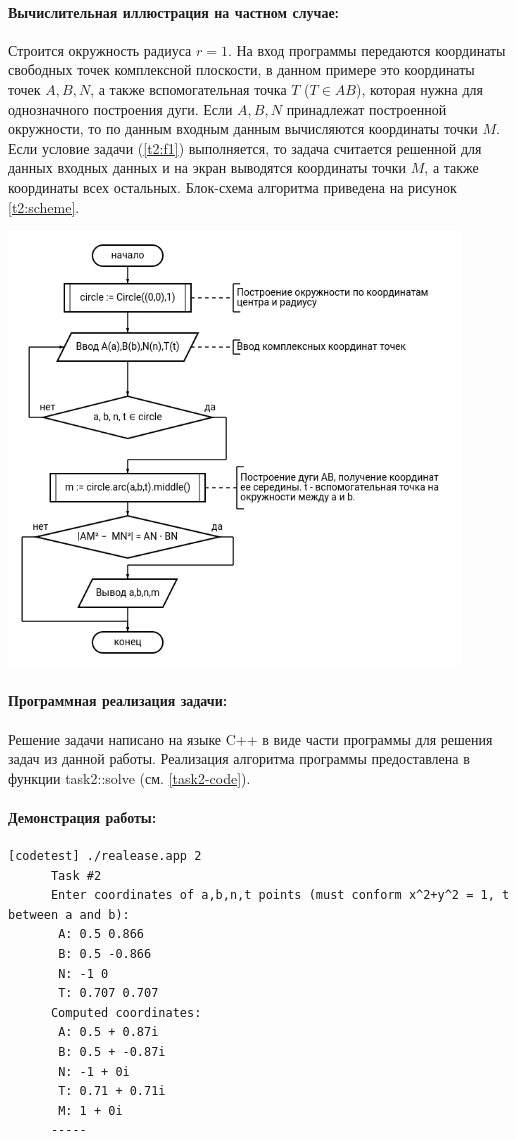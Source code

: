 {   \paragraph{Вычислительная иллюстрация на частном случае:}
   Строится окружность радиуса \(r = 1\). На вход программы передаются координаты свободных точек комплексной
   плоскости, в данном примере это координаты точек \(A,B,N\),
   а также вспомогательная точка \(T\) (\(T \in AB\)), которая нужна для однозначного построения дуги. Если \(A,B,N\)
   принадлежат построенной окружности, то по данным
   входным данным вычисляются координаты точки \(M\). Если условие задачи (\ref{t2:f1}) выполняется, то задача
   считается решенной для данных входных данных и на экран
   выводятся координаты точки \(M\), а также координаты всех остальных. Блок-схема алгоритма приведена на
   рисунок \ref{t2:scheme}.
   \begin{center}
      \includegraphics[width=0.9\textwidth]{images/task2-diagram.png}
      \label{t2:scheme}
   \end{center}
   \paragraph{Программная реализация задачи:}
   Решение задачи написано на языке C++ в виде части программы для решения задач из данной работы.
   Реализация алгоритма программы предоставлена в функции task2::solve (см. \ref{task2-code}).
   \paragraph{Демонстрация работы:}
   \vphantom{code}
   \begin{lstlisting}[language={},frame=none]
      [codetest] ./realease.app 2
      Task #2
      Enter coordinates of a,b,n,t points (must conform x^2+y^2 = 1, t between a and b):
       A: 0.5 0.866
       B: 0.5 -0.866
       N: -1 0
       T: 0.707 0.707
      Computed coordinates:
       A: 0.5 + 0.87i
       B: 0.5 + -0.87i
       N: -1 + 0i
       T: 0.71 + 0.71i
       M: 1 + 0i
      -----
   \end{lstlisting}
}
